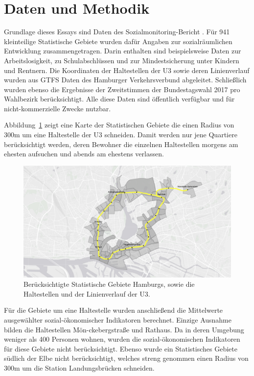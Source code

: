 \documentclass[10pt,a4paper]{article}
\begin{document}
\section*{Daten und Methodik}
Grundlage dieses Essays sind Daten des Sozialmonitoring-Bericht \citep{Sozialmonitoring_Bericht_2018}. Für 941 kleinteilige Statistische Gebiete wurden dafür Angaben zur sozialräumlichen Entwicklung zusammengetragen. Darin enthalten sind beispielsweise Daten zur Arbeitslosigkeit, zu Schulabschlüssen und zur Mindestsicherung unter Kindern und Rentnern. Die Koordinaten der Haltestellen der U3 sowie deren Linienverlauf wurden aus GTFS Daten des Hamburger Verkehrsverbund abgeleitet. Schließlich wurden ebenso die Ergebnisse der Zweitstimmen der Bundestagswahl 2017 pro Wahlbezirk berücksichtigt. Alle diese Daten sind öffentlich verfügbar und für nicht-kommerzielle Zwecke nutzbar.

Abbildung~\ref{fig:map} zeigt eine Karte der Statistischen Gebiete die einen Radius von 300m um eine Haltestelle der U3 schneiden. Damit werden nur jene Quartiere berücksichtigt werden, deren Bewohner die einzelnen Haltestellen morgens am ehesten aufsuchen und abends am ehestens verlassen.

\begin{figure}[h!]
	\centering
	\caption{Berücksichtigte Statistische Gebiete Hamburgs, sowie die Haltestellen und der Linienverlauf der U3.}
	\label{fig:map}
	\includegraphics[width=0.7\linewidth]{../../02_results/map}
\end{figure}

Für die Gebiete um eine Haltestelle wurden anschließend die Mittelwerte ausgewählter sozial-ökonomischer Indikatoren berechnet. Einzige Ausnahme bilden die Haltestellen Mön-ckebergstraße und Rathaus. Da in deren Umgebung weniger als 400 Personen wohnen, wurden die sozial-ökonomischen Indikatoren für diese Gebiete nicht berücksichtigt. Ebenso wurde ein Statistisches Gebiete südlich der Elbe nicht berücksichtigt, welches streng genommen einen Radius von 300m um die Station Landungsbrücken schneiden.
\end{document}
